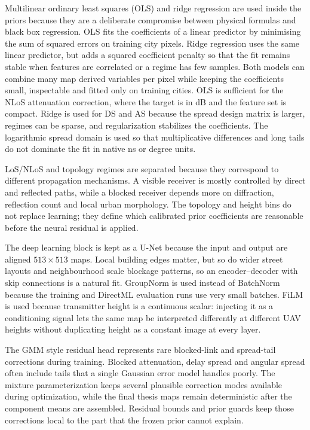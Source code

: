 Multilinear ordinary least squares (OLS) and ridge regression are used inside
the priors because they are a deliberate compromise between physical formulas
and black box regression. OLS fits the coefficients of a linear predictor by
minimising the sum of squared errors on training city pixels. Ridge regression
uses the same linear predictor, but adds a squared coefficient penalty so that
the fit remains stable when features are correlated or a regime has few
samples. Both models can combine many map derived variables per pixel while
keeping the coefficients small, inspectable and fitted only on training
cities. OLS is sufficient for the NLoS attenuation correction, where the target
is in dB and the feature set is compact. Ridge is used for DS and AS because
the spread design matrix is larger, regimes can be sparse, and regularization
stabilizes the coefficients. The logarithmic spread domain is used so that
multiplicative differences and long tails do not dominate the fit in native ns
or degree units.

LoS/NLoS and topology regimes are separated because they correspond to
different propagation mechanisms. A visible receiver is mostly controlled by
direct and reflected paths, while a blocked receiver depends more on
diffraction, reflection count and local urban morphology. The topology and
height bins do not replace learning; they define which calibrated prior
coefficients are reasonable before the neural residual is applied.

The deep learning block is kept as a U-Net because the input and output are
aligned \(513\times513\) maps. Local building edges matter, but so do wider
street layouts and neighbourhood scale blockage patterns, so an
encoder--decoder with skip connections is a natural fit. GroupNorm is used
instead of BatchNorm because the training and DirectML evaluation runs use very
small batches. FiLM is used because transmitter height is a continuous scalar:
injecting it as a conditioning signal lets the same map be interpreted
differently at different UAV heights without duplicating height as a constant
image at every layer.

The GMM style residual head represents rare blocked-link and spread-tail
corrections during training. Blocked attenuation, delay spread and angular
spread often include tails that a single Gaussian error model handles poorly.
The mixture parameterization keeps several plausible correction modes available
during optimization, while the final thesis maps remain deterministic after the
component means are assembled. Residual bounds and prior guards keep those
corrections local to the part that the frozen prior cannot explain.

